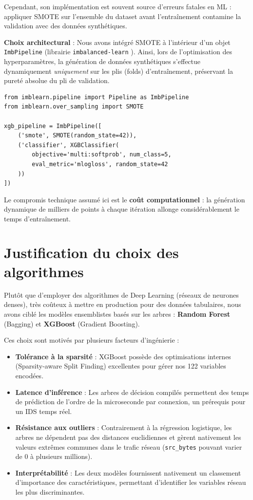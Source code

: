 \documentclass[12pt,a4paper]{report}
\begin{document}
Cependant, son implémentation est souvent source d'erreurs fatales en ML : appliquer SMOTE sur l'ensemble du dataset avant l'entraînement contamine la validation avec des données synthétiques.

\textbf{Choix architectural} : Nous avons intégré SMOTE à l'intérieur d'un objet \texttt{ImbPipeline} (librairie \texttt{imbalanced-learn} \cite{lemaitre2017}). Ainsi, lors de l'optimisation des hyperparamètres, la génération de données synthétiques s'effectue dynamiquement \textit{uniquement} sur les plis (folds) d'entraînement, préservant la pureté absolue du pli de validation.

\begin{lstlisting}[caption={Pipeline SMOTE intégré à la validation croisée.}]
from imblearn.pipeline import Pipeline as ImbPipeline
from imblearn.over_sampling import SMOTE

xgb_pipeline = ImbPipeline([
    ('smote', SMOTE(random_state=42)),
    ('classifier', XGBClassifier(
        objective='multi:softprob', num_class=5,
        eval_metric='mlogloss', random_state=42
    ))
])
\end{lstlisting}

Le compromis technique assumé ici est le \textbf{coût computationnel} : la génération dynamique de milliers de points à chaque itération allonge considérablement le temps d'entraînement.

\section{Justification du choix des algorithmes}

Plutôt que d'employer des algorithmes de Deep Learning (réseaux de neurones denses), très coûteux à mettre en production pour des données tabulaires, nous avons ciblé les modèles ensemblistes basés sur les arbres : \textbf{Random Forest} (Bagging) et \textbf{XGBoost} \cite{chen2016} (Gradient Boosting).

Ces choix sont motivés par plusieurs facteurs d'ingénierie :
\begin{itemize}
    \item \textbf{Tolérance à la sparsité} : XGBoost possède des optimisations internes (Sparsity-aware Split Finding) excellentes pour gérer nos 122 variables encodées.
    \item \textbf{Latence d'inférence} : Les arbres de décision compilés permettent des temps de prédiction de l'ordre de la microseconde par connexion, un prérequis pour un IDS temps réel.
    \item \textbf{Résistance aux outliers} : Contrairement à la régression logistique, les arbres ne dépendent pas des distances euclidiennes et gèrent nativement les valeurs extrêmes communes dans le trafic réseau (\texttt{src\_bytes} pouvant varier de 0 à plusieurs millions).
    \item \textbf{Interprétabilité} : Les deux modèles fournissent nativement un classement d'importance des caractéristiques, permettant d'identifier les variables réseau les plus discriminantes.
\end{itemize}
\end{document}
